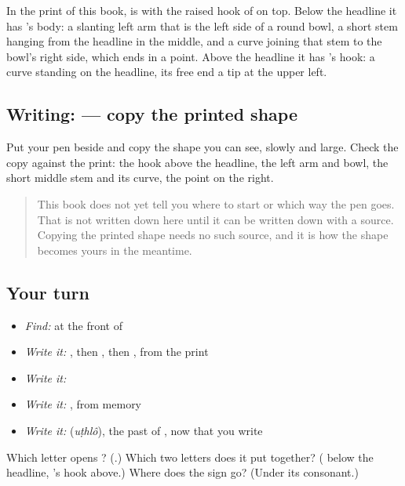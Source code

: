 In the print of this book, \textbf{} is \textbf{} with the raised hook of \textbf{} on top. Below the headline it has \textbf{}'s body: a slanting left arm that is the left side of a round bowl, a short stem hanging from the headline in the middle, and a curve joining that stem to the bowl's right side, which ends in a point. Above the headline it has \textbf{}'s hook: a curve standing on the headline, its free end a tip at the upper left.

\subsection*{Writing:  — copy the printed shape}
Put your pen beside \textbf{} and copy the shape you can see, slowly and large. Check the copy against the print: the hook above the headline, the left arm and bowl, the short middle stem and its curve, the point on the right.

\begin{quote}
This book does not yet tell you where to start  or which way the pen goes. That is not written down here until it can be written down with a source. Copying the printed shape needs no such source, and it is how the shape becomes yours in the meantime.
\end{quote}

\subsection*{Your turn}
\begin{itemize}
\raggedright
  \item \emph{Find:}  at the front of \textbf{}
  \item \emph{Write it:} , then , then , from the print
  \item \emph{Write it:} \textbf{}
  \item \emph{Write it:} \textbf{}, from memory
  \item \emph{Write it:} \textbf{} (\emph{uṭhlô}), the past of \textbf{}, now that you write \textbf{}
\end{itemize}

\begin{tcolorbox}[breakable,colback=teal!4,colframe=teal!35!black,title={Before you move on}]
Which letter opens \textbf{}? (\textbf{}.) Which two letters does it put together? (\textbf{} below the headline, \textbf{}'s hook above.) Where does the sign \textbf{} go? (Under its consonant.)
\end{tcolorbox}
